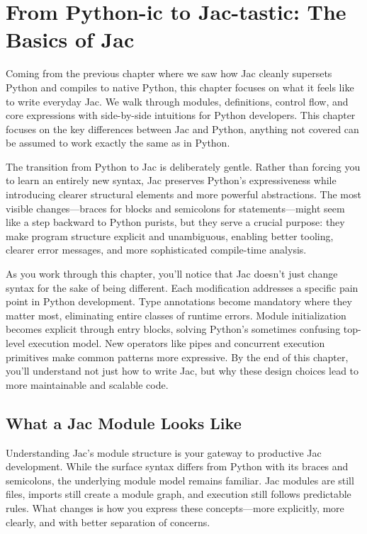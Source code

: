 \mtcaddchapter
\chapter{From Python-ic to Jac-tastic: The Basics of Jac}
\minitoc

Coming from the previous chapter where we saw how Jac cleanly supersets Python and compiles to native Python, this chapter focuses on what it feels like to write everyday Jac. We walk through modules, definitions, control flow, and core expressions with side-by-side intuitions for Python developers. This chapter focuses on the key differences between Jac and Python, anything not covered can be assumed to work exactly the same as in Python.

The transition from Python to Jac is deliberately gentle. Rather than forcing you to learn an entirely new syntax, Jac preserves Python's expressiveness while introducing clearer structural elements and more powerful abstractions. The most visible changes—braces for blocks and semicolons for statements—might seem like a step backward to Python purists, but they serve a crucial purpose: they make program structure explicit and unambiguous, enabling better tooling, clearer error messages, and more sophisticated compile-time analysis.

As you work through this chapter, you'll notice that Jac doesn't just change syntax for the sake of being different. Each modification addresses a specific pain point in Python development. Type annotations become mandatory where they matter most, eliminating entire classes of runtime errors. Module initialization becomes explicit through entry blocks, solving Python's sometimes confusing top-level execution model. New operators like pipes and concurrent execution primitives make common patterns more expressive. By the end of this chapter, you'll understand not just how to write Jac, but why these design choices lead to more maintainable and scalable code.

\section{What a Jac Module Looks Like}

Understanding Jac's module structure is your gateway to productive Jac development. While the surface syntax differs from Python with its braces and semicolons, the underlying module model remains familiar. Jac modules are still files, imports still create a module graph, and execution still follows predictable rules. What changes is how you express these concepts—more explicitly, more clearly, and with better separation of concerns.


